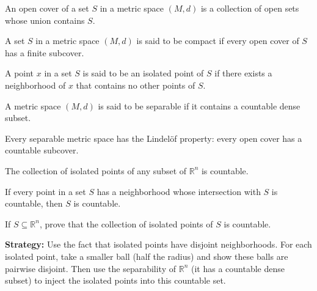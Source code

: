 \begin{definition}
An open cover of a set $S$ in a metric space $(M,d)$ is a collection of open sets whose union contains $S$.
\end{definition}

\begin{definition}
A set $S$ in a metric space $(M,d)$ is said to be compact if every open cover of $S$ has a finite subcover.
\end{definition}

\begin{definition}
A point $x$ in a set $S$ is said to be an isolated point of $S$ if there exists a neighborhood of $x$ that contains no other points of $S$.
\end{definition}

\begin{definition}
A metric space $(M,d)$ is said to be separable if it contains a countable dense subset.
\end{definition}

\begin{theorem}
Every separable metric space has the Lindelöf property: every open cover has a countable subcover.
\end{theorem}

\begin{theorem}
The collection of isolated points of any subset of $\mathbb{R}^n$ is countable.
\end{theorem}

\begin{theorem}
If every point in a set $S$ has a neighborhood whose intersection with $S$ is countable, then $S$ is countable.
\end{theorem}



\begin{problembox}
If \( S \subseteq \mathbb{R}^n \), prove that the collection of isolated points of \( S \) is countable.
\end{problembox}

\noindent\textbf{Strategy:} Use the fact that isolated points have disjoint neighborhoods. For each isolated point, take a smaller ball (half the radius) and show these balls are pairwise disjoint. Then use the separability of $\mathbb{R}^n$ (it has a countable dense subset) to inject the isolated points into this countable set.

